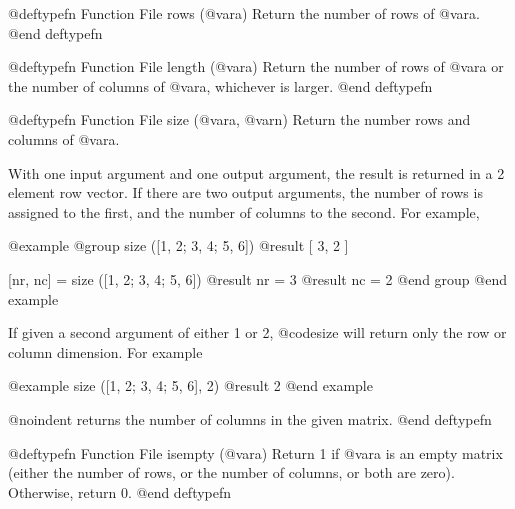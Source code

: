 @deftypefn {Function File} {} rows (@var{a})
Return the number of rows of @var{a}.
@end deftypefn

@deftypefn {Function File} {} length (@var{a})
Return the number of rows of @var{a} or the number of columns of
@var{a}, whichever is larger.
@end deftypefn

@deftypefn {Function File} {} size (@var{a}, @var{n})
Return the number rows and columns of @var{a}.

With one input argument and one output argument, the result is returned
in a 2 element row vector.  If there are two output arguments, the
number of rows is assigned to the first, and the number of columns to
the second.  For example,

@example
@group
size ([1, 2; 3, 4; 5, 6])
     @result{} [ 3, 2 ]

[nr, nc] = size ([1, 2; 3, 4; 5, 6])
     @result{} nr = 3
     @result{} nc = 2
@end group
@end example

If given a second argument of either 1 or 2, @code{size} will return
only the row or column dimension.  For example

@example
size ([1, 2; 3, 4; 5, 6], 2)
     @result{} 2
@end example

@noindent
returns the number of columns in the given matrix.
@end deftypefn

@deftypefn {Function File} {} isempty (@var{a})
Return 1 if @var{a} is an empty matrix (either the number of rows, or
the number of columns, or both are zero).  Otherwise, return 0.
@end deftypefn


